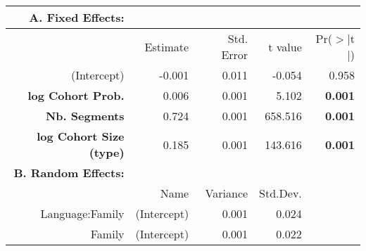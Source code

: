 \begin{tabular}{rrrrr}
 {\bf A. Fixed Effects:} \\
\hline
 & Estimate & Std. Error & t value & Pr($>$$|$t$|$) \\ 
  \hline
(Intercept) & -0.001 & 0.011 & -0.054 & 0.958 \\ 
 {\bf log Cohort Prob.} & 0.006 & 0.001 & 5.102 & {\bf 0.001} \\ 
  {\bf Nb. Segments }& 0.724 & 0.001 & 658.516 & {\bf 0.001} \\ 
  {\bf log Cohort Size (type)} & 0.185 & 0.001 & 143.616 & {\bf 0.001} \\ 

\hline \hline
{\bf B. Random Effects:} \\
\hline
& Name & Variance & Std.Dev. \\
\hline
Language:Family & (Intercept) & 0.001 & 0.024 \\
Family & (Intercept) & 0.001 & 0.022 \\
\end{tabular}
